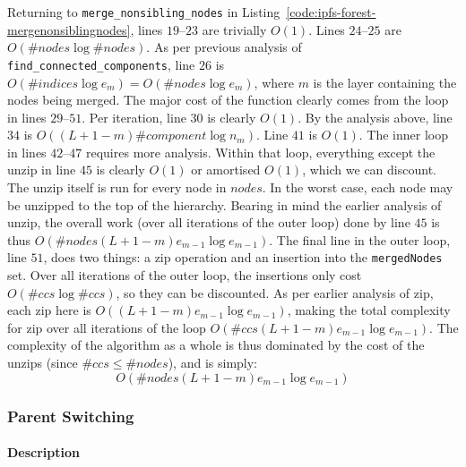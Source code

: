 Returning to \texttt{merge_nonsibling_nodes} in Listing~\ref{code:ipfs-forest-mergenonsiblingnodes}, lines $19$--$23$ are trivially $O(1)$. Lines $24$--$25$ are $O(\#\mathit{nodes} \log \#\mathit{nodes})$. As per previous analysis of \texttt{find_connected_components}, line $26$ is $O(\#\mathit{indices} \log e_m) = O(\#\mathit{nodes} \log e_m)$, where $m$ is the layer containing the nodes being merged. The major cost of the function clearly comes from the loop in lines $29$--$51$. Per iteration, line $30$ is clearly $O(1)$. By the analysis above, line $34$ is $O((L+1-m) \#\mathit{component} \log n_m)$. Line $41$ is $O(1)$. The inner loop in lines $42$--$47$ requires more analysis. Within that loop, everything except the unzip in line $45$ is clearly $O(1)$ or amortised $O(1)$, which we can discount. The unzip itself is run for every node in $\mathit{nodes}$. In the worst case, each node may be unzipped to the top of the hierarchy. Bearing in mind the earlier analysis of unzip, the overall work (over all iterations of the outer loop) done by line $45$ is thus $O(\#\mathit{nodes} (L+1-m) e_{m-1} \log e_{m-1})$. The final line in the outer loop, line $51$, does two things: a zip operation and an insertion into the \texttt{mergedNodes} set. Over all iterations of the outer loop, the insertions only cost $O(\#\mathit{ccs} \log \#\mathit{ccs})$, so they can be discounted. As per earlier analysis of zip, each zip here is $O((L+1-m) e_{m-1} \log e_{m-1})$, making the total complexity for zip over all iterations of the loop $O(\#\mathit{ccs} (L+1-m) e_{m-1} \log e_{m-1})$. The complexity of the algorithm as a whole is thus dominated by the cost of the unzips (since $\#\mathit{ccs} \le \#\mathit{nodes}$), and is simply:
%
\[
O(\#\mathit{nodes} (L+1-m) e_{m-1} \log e_{m-1})
\]


\afterpage{\clearpage}
\newpage

\subsubsection{Parent Switching}


\paragraph{Description}

